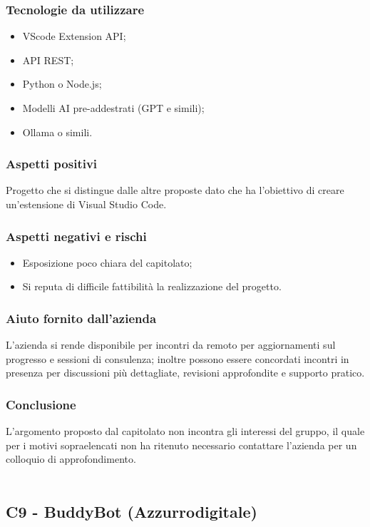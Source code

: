 \documentclass[10pt]{article}
\begin{document}
\subsubsection{Tecnologie da utilizzare}
\begin{itemize}
    \item VScode Extension API;
    \item API REST;
    \item Python o Node.js;
    \item Modelli AI pre-addestrati (GPT e simili);
    \item Ollama o simili.
\end{itemize}
\subsubsection{Aspetti positivi}
Progetto che si distingue dalle altre proposte dato che ha l'obiettivo di creare un'estensione di Visual Studio Code.
\subsubsection{Aspetti negativi e rischi}
\begin{itemize}
    \item Esposizione poco chiara del capitolato;
    \item Si reputa di difficile fattibilità la realizzazione del progetto.
\end{itemize}
\subsubsection{Aiuto fornito dall'azienda}
L'azienda si rende disponibile per incontri da remoto per aggiornamenti sul progresso e sessioni di consulenza; inoltre possono essere concordati incontri in presenza per discussioni più dettagliate, revisioni approfondite e supporto pratico.
\subsubsection{Conclusione}
L'argomento proposto dal capitolato non incontra gli interessi del gruppo, il quale per i motivi sopraelencati non ha ritenuto necessario contattare l'azienda per un colloquio di approfondimento.
\\\\
\subsection{C9 - BuddyBot (Azzurrodigitale)}
\end{document}
